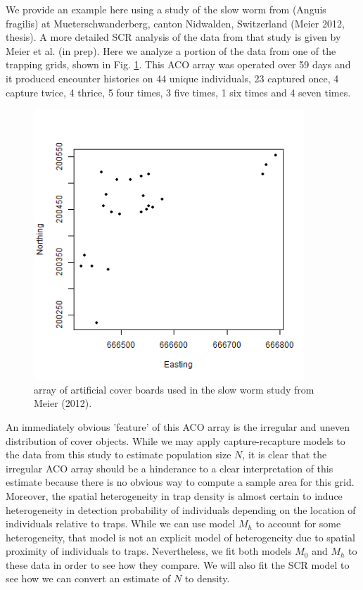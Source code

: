 \documentclass{book}
\begin{document}
We provide an example here using a study of the slow worm from 
(Anguis fragilis) at
Mueterschwanderberg, canton Nidwalden, Switzerland (Meier 2012,
thesis). A more detailed SCR analysis of the data from that study is
given by  Meier et al. (in prep). Here we analyze a portion of the
data from one of the trapping grids, shown in
Fig. \ref{fig.fig1}. This ACO array was operated over 59 days and it
produced encounter histories on 44 unique individuals, 23 captured once, 4
capture twice, 4 thrice, 5 four times, 3 five times, 1 six times and 4
seven times. 
\begin{figure}[h]
\centering
\includegraphics[height=4in,width=4in]{traps.png}
\caption{
array of artificial cover boards used in the slow worm study from
Meier (2012). 
}
\label{fig.fig1}
\end{figure}
An immediately obvious 'feature' of this ACO array is the irregular
and uneven distribution of cover objects.  While we may apply
capture-recapture models to the data from this study to estimate
population size $N$, it is clear that the irregular ACO array should
be a hinderance to a clear interpretation of this estimate because
there is no obvious way to compute a sample area for this
grid. Moreover, the spatial heterogeneity in trap density is almost
certain to induce heterogeneity in detection probability of
individuals depending on the location of individuals relative to
traps. While we can use model $M_h$ to account for some heterogeneity,
that model is not an explicit model of heterogeneity due to spatial
proximity of individuals to traps. Nevertheless, we fit both models
$M_0$ and $M_h$ to these data in order to see how they compare.  We
will also fit the SCR model to see how we can convert an estimate of
$N$ to density. 
\end{document}
